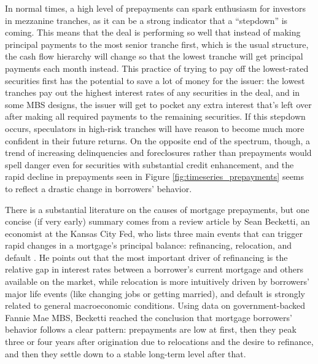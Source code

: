 \documentclass[12pt]{article}
\begin{document}
In normal times, a high level of prepayments can spark enthusiasm for investors in mezzanine tranches, as it can be a strong indicator that a “stepdown” is coming. This means that the deal is performing so well that instead of making principal payments to the most senior tranche first, which is the usual structure, the cash flow hierarchy will change so that the lowest tranche will get principal payments each month instead. This practice of trying to pay off the lowest-rated securities first has the potential to save a lot of money for the issuer: the lowest tranches pay out the highest interest rates of any securities in the deal, and in some MBS designs, the issuer will get to pocket any extra interest that’s left over after making all required payments to the remaining securities. If this stepdown occurs, speculators in high-risk tranches will have reason to become much more confident in their future returns. On the opposite end of the spectrum, though, a trend of increasing delinquencies and foreclosures rather than prepayments would spell danger even for securities with substantial credit enhancement, and the rapid decline in prepayments seen in Figure \ref{fig:timeseries_prepayments} seems to reflect a drastic change in borrowers’ behavior.

	There is a substantial literature on the causes of mortgage prepayments, but one concise (if very early) summary comes from a review article by Sean Becketti, an economist at the Kansas City Fed, who lists three main events that can trigger rapid changes in a mortgage’s principal balance: refinancing, relocation, and default \parencite{becketti89}. He points out that the most important driver of refinancing is the relative gap in interest rates between a borrower’s current mortgage and others available on the market, while relocation is more intuitively driven by borrowers’ major life events (like changing jobs or getting married), and default is strongly related to general macroeconomic conditions. Using data on government-backed Fannie Mae MBS, Becketti reached the conclusion that mortgage borrowers’ behavior follows a clear pattern: prepayments are low at first, then they peak three or four years after origination due to relocations and the desire to refinance, and then they settle down to a stable long-term level after that.
	
\end{document}
